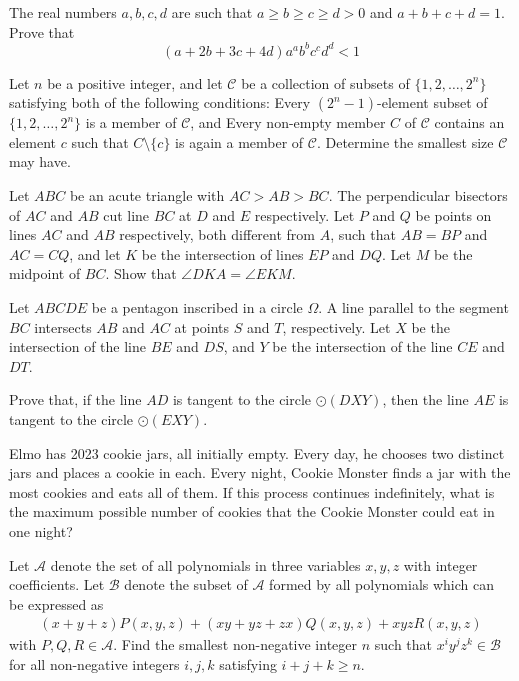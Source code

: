 \documentclass[11pt]{scrartcl}
\begin{document}
\begin{problem}[3813623497653179264]
	The real numbers $a, b, c, d$ are such that $a\geq b\geq c\geq d>0$ and $a+b+c+d=1$. Prove that
\[(a+2b+3c+4d)a^ab^bc^cd^d<1\]
\end{problem}
\begin{problem}[9130156978935948779]
	Let $n{}$ be a positive integer, and let $\mathcal{C}$ be a collection of subsets of $\{1,2,\ldots,2^n\}$ satisfying both of the following conditions:
Every $(2^n-1)$-element subset of $\{1,2,\ldots,2^n\}$ is a member of $\mathcal{C}$, and
Every non-empty member $C$ of $\mathcal{C}$ contains an element $c$ such that $C\setminus\{c\}$ is again a member of $\mathcal{C}$.
Determine the smallest size $\mathcal{C}$ may have.
\end{problem}
\begin{problem}[27464517430039]
	Let $ABC$ be an acute triangle with $AC > AB > BC$. The perpendicular bisectors of $AC$ and $AB$ cut line $BC$ at $D$ and $E$ respectively. Let $P$ and $Q$ be points on lines $AC$ and $AB$ respectively, both different from $A$, such that $AB = BP$ and $AC = CQ$, and let $K$ be the intersection of lines $EP$ and $DQ$. Let $M$ be the midpoint of $BC$. Show that $\angle DKA = \angle EKM$.
\end{problem}
\begin{problem}[5867489266334805897]
	Let $ABCDE$ be a pentagon inscribed in a circle $\Omega$. A line parallel to the segment $BC$ intersects $AB$ and $AC$ at points $S$ and $T$, respectively. Let $X$ be the intersection of the line $BE$ and $DS$, and $Y$ be the intersection of the line $CE$ and $DT$.

Prove that, if the line $AD$ is tangent to the circle $\odot(DXY)$, then the line $AE$ is tangent to the circle $\odot(EXY)$.
\end{problem}
\begin{problem}[2258867823273260514]
Elmo has 2023 cookie jars, all initially empty. Every day, he chooses two distinct jars and places a cookie in each. Every night, Cookie Monster finds a jar with the most cookies and eats all of them. If this process continues indefinitely, what is the maximum possible number of cookies that the Cookie Monster could eat in one night?
\end{problem}
\begin{problem}[712971117639738]
Let $\mathcal{A}$ denote the set of all polynomials in three variables $x, y, z$ with integer coefficients. Let $\mathcal{B}$ denote the subset of $\mathcal{A}$ formed by all polynomials which can be expressed as
\begin{align*}
(x + y + z)P(x, y, z) + (xy + yz + zx)Q(x, y, z) + xyzR(x, y, z)
\end{align*}with $P, Q, R \in \mathcal{A}$. Find the smallest non-negative integer $n$ such that $x^i y^j z^k \in \mathcal{B}$ for all non-negative integers $i, j, k$ satisfying $i + j + k \geq n$.
\end{problem}
\end{document}

